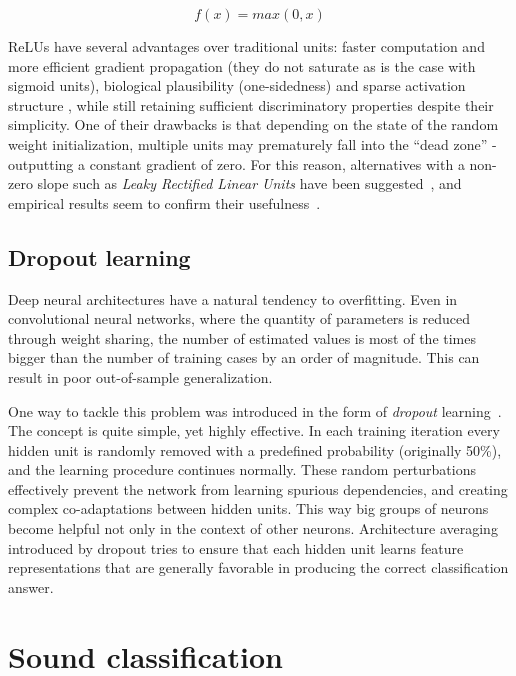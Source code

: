 \documentclass{article}
\begin{document}
\vspace{-6pt}

\begin{equation}
f(x) = max(0, x)
\end{equation}

ReLUs have several advantages over traditional units: faster computation and more efficient gradient propagation (they do not saturate as is the case with sigmoid units), biological plausibility (one-sidedness) and sparse activation structure \cite{glorot2011deep}, while still retaining sufficient discriminatory properties despite their simplicity. One of their drawbacks is that depending on the state of the random weight initialization, multiple units may prematurely fall into the ``dead zone'' - outputting a constant gradient of zero. For this reason, alternatives with a non-zero slope such as \textit{Leaky Rectified Linear Units} have been suggested~\cite{maas2013rectifier}, and empirical results seem to confirm their usefulness~\cite{xu2015empirical}.

\subsection{Dropout learning}

Deep neural architectures have a natural tendency to overfitting. Even in convolutional neural networks, where the quantity of parameters is reduced through weight sharing, the number of estimated values is most of the times bigger than the number of training cases by an order of magnitude. This can result in poor out-of-sample generalization.

One way to tackle this problem was introduced in the form of \textit{dropout} learning~\cite{hinton2012improving}. The concept is quite simple, yet highly effective. In each training iteration every hidden unit is randomly removed with a predefined probability (originally 50\%), and the learning procedure continues normally. These random perturbations effectively prevent the network from learning spurious dependencies, and creating complex co-adaptations between hidden units. This way big groups of neurons become helpful not only in the context of other neurons. Architecture averaging introduced by dropout tries to ensure that each hidden unit learns feature representations that are generally favorable in producing the correct classification answer. 

\vspace{-12pt}

\section{Sound classification}
\end{document}
